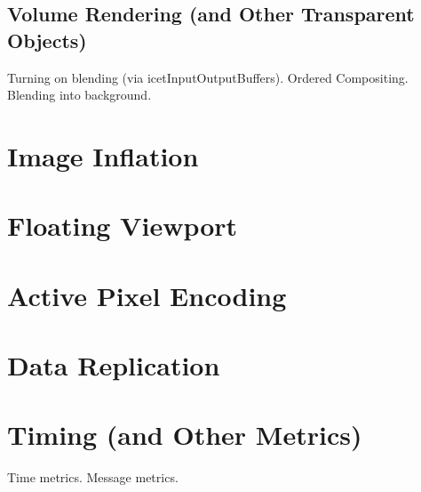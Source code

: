 \subsection{Volume Rendering (and Other Transparent Objects)}
\label{sec:Customizing_Compositing:Volume_Rendering}

Turning on blending (via icetInputOutputBuffers).
Ordered Compositing.
Blending into background.



\section{Image Inflation}
\label{sec:Customizing_Compositing:Image_Inflation}

\section{Floating Viewport}
\label{sec:Customizing_Compositing:Floating_Viewport}

\section{Active Pixel Encoding}
\label{sec:Customizing_Compositing:Active_Pixel_Encoding}

\section{Data Replication}
\label{sec:Customizing_Compositing:Data_Replication}

\section{Timing (and Other Metrics)}
\label{sec:Customizing_Compositing:Timing}

Time metrics.
Message metrics.

